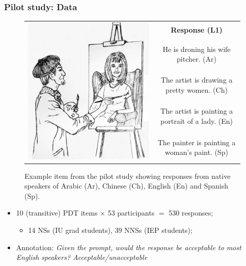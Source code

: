 \documentclass[handout,xcolor={dvipsnames}]{beamer}
\begin{document}
\begin{frame}
\frametitle{Pilot study: Data}
\begin{small}
\begin{figure}[htb!]
\begin{center}
\bgroup
\def\arraystretch{1.45}
\begin{tabular}{|c|c|}
\hline
\multirow{5}{*}{\includegraphics[trim=0 50 0 20,clip,width=0.28\columnwidth]{figures/exampleprompt.jpg}} &
\textbf{Response (L1)} \\
\cline{2-2}
& He is droning his wife pitcher. (Ar) \\
\cline{2-2}
& The artist is drawing a pretty women. (Ch) \\
\cline{2-2}
& The artist is painting a portrait of a lady. (En) \\
\cline{2-2}
& The painter is painting a woman's paint. (Sp) \\
\hline
\end{tabular}
\egroup
\end{center}
\caption{Example item from the pilot study showing responses from native speakers of Arabic (Ar), Chinese (Ch), English (En) and Spanish (Sp).}
\label{fig:example-picture}
\end{figure}
\end{small}
\vspace{-1em}
\pause
\begin{itemize}
\item 10 (transitive) PDT items $\times$ 53 participants $=$ 530 responses;
\pause
\begin{itemize}
\item 14 NSs (IU grad students), 39 NNSs (IEP students);
\end{itemize}
\pause
\item Annotation: \textit{Given the prompt, would the response be acceptable to most English speakers? Acceptable/unacceptable}
\begin{itemize}

\end{itemize}
\end{itemize}
\end{frame}
\end{document}
